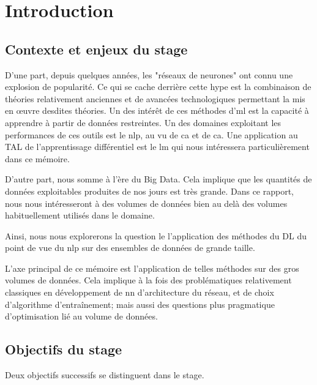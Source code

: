 \chapter{Introduction}

\section[Contexte \& Enjeux]{Contexte et enjeux du stage}

D'une part, depuis quelques années, les "réseaux de neurones" ont connu une explosion de popularité.
Ce qui se cache derrière cette hype est la combinaison de théories relativement anciennes et de avancées technologiques permettant la mis en œuvre desdites théories.%
Un des intérêt de ces méthodes d'\gls{ml} est la capacité à apprendre à partir de données restreintes.
Un des domaines exploitant les performances de ces outils est le \gls{nlp}, au vu de ca et de ca.%
Une application au TAL de l'apprentissage différentiel est le \gls{lm} qui nous intéressera particulièrement dans ce mémoire.%

D'autre part, nous somme à l'ère du \og Big Data\fg{}. Cela implique que les quantités de données exploitables produites de nos jours est très grande. Dans ce rapport, nous nous intéresseront à des volumes de données bien au delà des volumes habituellement utilisés dans le domaine.%

Ainsi, nous nous explorerons la question le l'application des méthodes du DL du point de vue du \gls{nlp} sur des ensembles de données de grande taille.

L'axe principal de ce mémoire est l'application de telles méthodes sur des gros volumes de données.
Cela implique à la fois des problématiques relativement classiques en développement de \gls{nn} d'architecture du réseau, et de choix d'algorithme d'entraînement; mais aussi des questions plus pragmatique d'optimisation lié au volume de données.%


\section[Objectifs]{Objectifs du stage}
Deux objectifs successifs se distinguent dans le stage.

